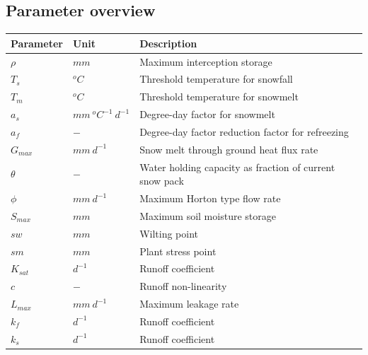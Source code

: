 \subsection{Parameter overview}
\begin{table}[htbp]
  \centering
    \begin{tabular}{lll}
    \toprule
    Parameter & Unit  & Description \\
    \midrule
    $\rho$ & $mm$  & Maximum interception storage \\
    $T_s$ & $^oC$ & Threshold temperature for snowfall \\
    $T_m$ & $^oC$ & Threshold temperature for snowmelt \\
    $a_s$ & $mm~^oC^{-1}~d^{-1}$ & Degree-day factor for snowmelt \\
    $a_f$ & $-$   & Degree-day factor reduction factor for refreezing \\
    $G_{max}$ & $mm~d^{-1}$ & Snow melt through ground heat flux rate \\
    $\theta$ & $-$   & Water holding capacity as fraction of current snow pack \\
    $\phi$ & $mm~d^{-1}$ & Maximum Horton type flow rate \\
    $S_{max}$ & $mm$  & Maximum soil moisture storage \\
    $sw$  & $mm$  & Wilting point \\
    $sm$  & $mm$  & Plant stress point \\
    $K_{sat}$ & $d^{-1}$ & Runoff coefficient \\
    $c$   & $-$   & Runoff non-linearity \\
    $L_{max}$ & $mm~d^{-1}$ & Maximum leakage rate \\
    $k_f$ & $d^{-1}$ & Runoff coefficient \\
    $k_s$ & $d^{-1}$ & Runoff coefficient \\
    \bottomrule
    \end{tabular}%
  \label{tab:addlabel}%
\end{table}%


